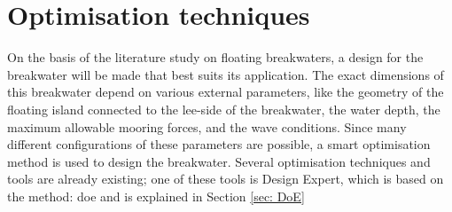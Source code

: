 







\section{Optimisation techniques}






On the basis of the literature study on floating breakwaters, a design for the breakwater will be made that best suits its application. The exact dimensions of this breakwater depend on various external parameters, like the geometry of the floating island connected to the lee-side of the breakwater, the water depth, the maximum allowable mooring forces, and the wave conditions. Since many different configurations of these parameters are possible, a smart optimisation method is used to design the breakwater. Several optimisation techniques and tools are already existing; one of these tools is Design Expert, which is based on the method: \acrfull{doe} and is explained in Section \ref{sec: DoE}



